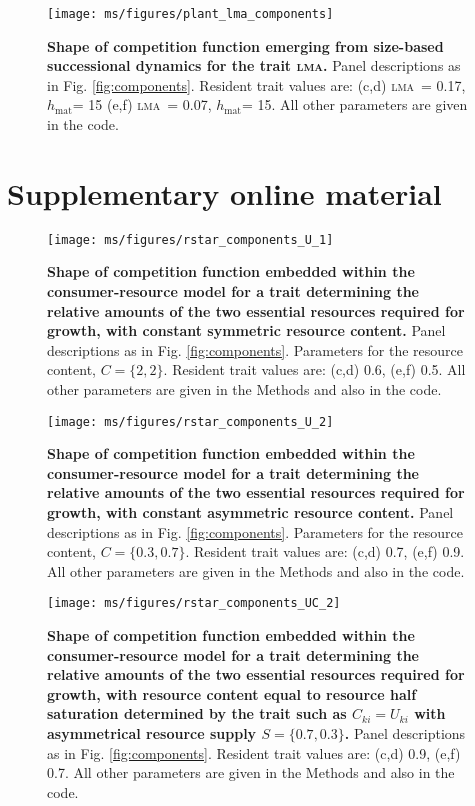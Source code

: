 \documentclass[a4paper,11pt]{article}
\newcommand{\hmat}{\ensuremath{h_{\text{mat}}}}
\newcommand{\lma}{\textsc{lma}}
\begin{document}
\clearpage

\begin{figure}[ht]
 \centering
 \texttt{[image: ms/figures/plant\_lma\_components]}
 \caption{{\bf Shape of competition function emerging from size-based successional dynamics for the trait \lma.} 
 Panel descriptions as in Fig. \ref{fig:components}. Resident trait values are: (c,d) \lma\ = 0.17, \hmat = 15 (e,f) \lma\ = 0.07, \hmat = 15. All other parameters are given in the code.}
 \label{fig:plant_lma}
\end{figure}

\clearpage




\clearpage

\section{Supplementary online material}

\renewcommand{\thefigure}{S\arabic{figure}}
\setcounter{figure}{0}

\begin{figure}[ht]
 \centering
	\texttt{[image: ms/figures/rstar\_components\_U\_1]}
 \caption{{\bf Shape of competition function embedded within the consumer-resource model for a trait determining the relative amounts of the two essential resources required for growth, with constant symmetric resource content.} Panel descriptions as in Fig. \ref{fig:components}. Parameters for the resource content, $C = \{2, 2\}$. Resident trait values are: (c,d) 0.6, (e,f) 0.5. All other parameters are given in the Methods and also in the code.}
 \label{figS:Rstar_U1}
\end{figure}

\newpage
\begin{figure}[ht]
 \centering
	\texttt{[image: ms/figures/rstar\_components\_U\_2]}
 \caption{{\bf Shape of competition function embedded within the consumer-resource model for a trait determining the relative amounts of the two essential resources required for growth, with constant asymmetric resource content.} Panel descriptions as in Fig. \ref{fig:components}. Parameters for the resource content, $C = \{0.3, 0.7\}$. Resident trait values are: (c,d) 0.7, (e,f) 0.9. All other parameters are given in the Methods and also in the code.}
 \label{figS:Rstar_U2}
\end{figure}

\newpage
\begin{figure}[ht]
 \centering
 \texttt{[image: ms/figures/rstar\_components\_UC\_2]}
 \caption{{\bf Shape of competition function embedded within the consumer-resource model for a trait determining the relative amounts of the two essential resources required for growth, with resource content equal to resource half saturation determined by the trait such as $C_{ki} = U_{ki}$ with asymmetrical resource supply $S = \{0.7, 0.3\}$.} Panel descriptions as in Fig. \ref{fig:components}. Resident trait values are: (c,d) 0.9, (e,f) 0.7. All other parameters are given in the Methods and also in the code.} 
 \label{fig:Srstar_components_UC2}
\end{figure}
\end{document}
